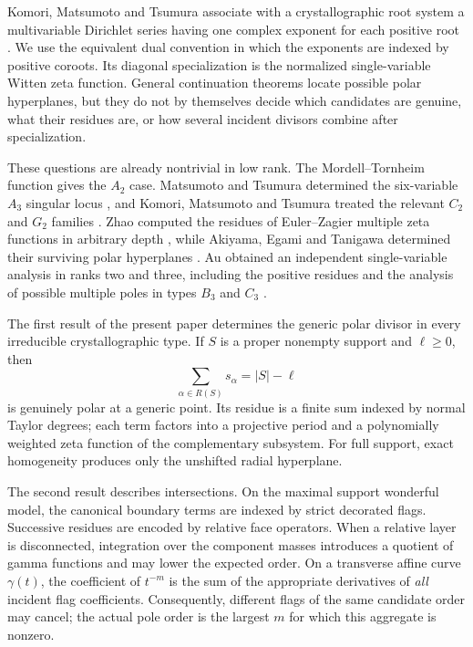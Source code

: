 \documentclass[11pt]{article}
\begin{document}
Komori, Matsumoto and Tsumura associate with a crystallographic root
system a multivariable Dirichlet series having one complex exponent
for each positive root \cite{KMT2010PLMS,KMTBook2023}.  We use the
equivalent dual convention in which the exponents are indexed by
positive coroots.  Its diagonal specialization is the normalized
single-variable Witten zeta function.  General continuation theorems
locate possible polar hyperplanes, but they do not by themselves
decide which candidates are genuine, what their residues are, or how
several incident divisors combine after specialization.

These questions are already nontrivial in low rank.  The
Mordell--Tornheim function gives the \(A_2\) case.  Matsumoto and
Tsumura determined the six-variable \(A_3\) singular locus
\cite{MatsumotoTsumura2006}, and Komori, Matsumoto and Tsumura treated
the relevant \(C_2\) and \(G_2\) families
\cite{KMT2010II,KMT2011G2}.  Zhao computed the residues of
Euler--Zagier multiple zeta functions in arbitrary depth
\cite{Zhao2000}, while Akiyama, Egami and Tanigawa determined their
surviving polar hyperplanes \cite{AET2001}.  Au obtained an independent
single-variable analysis in ranks two and three, including the
positive residues and the analysis of possible multiple poles in
types \(B_3\) and \(C_3\) \cite{Au2025}.

The first result of the present paper determines the generic polar
divisor in every irreducible crystallographic type.  If \(S\) is a
proper nonempty support and \(\ell\geq0\), then
\[
 \sum_{\alpha\in R(S)}s_\alpha=|S|-\ell
\]
is genuinely polar at a generic point.  Its residue is a finite sum
indexed by normal Taylor degrees; each term factors into a
projective period and a polynomially weighted zeta function of the
complementary subsystem.  For full support, exact homogeneity produces
only the unshifted radial hyperplane.

The second result describes intersections.  On the maximal support
wonderful model, the canonical boundary terms are indexed by strict
decorated flags.  Successive residues are encoded by relative face
operators.  When a relative layer is disconnected, integration over
the component masses introduces a quotient of gamma functions and may
lower the expected order.  On a transverse affine curve
\(\gamma(t)\), the coefficient of \(t^{-m}\) is the sum of the
appropriate derivatives of \emph{all} incident flag coefficients.
Consequently, different flags of the same candidate order may cancel;
the actual pole order is the largest \(m\) for which this aggregate is
nonzero.
\end{document}
